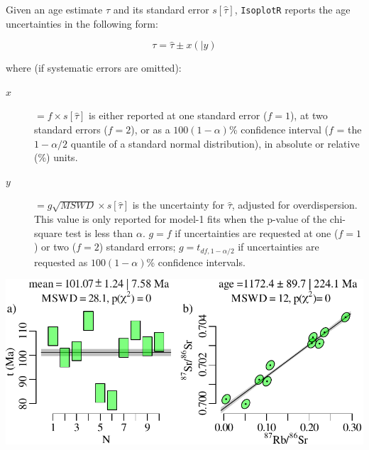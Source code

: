 \begin{refsection}
Given an age estimate $\hat{\tau}$ and its standard error
$s[\hat{\tau}]$, \texttt{IsoplotR} reports the age uncertainties in
the following form:

\[
\tau = \hat{\tau} \pm x (\mid y)
\]

\noindent where (if systematic errors are omitted):

\begin{description}
\item[$x$] $= f \times s[\hat{\tau}]$ is either reported at one
  standard error ($f=1$), at two standard errors ($f=2$), or as a
  $100(1-\alpha)$\% confidence interval ($f$ = the $1-\alpha/2$
  quantile of a standard normal distribution), in absolute or relative
  (\%) units.
\item[$y$] $= g \sqrt{MSWD} \times s[\hat{\tau}]$ is the uncertainty
  for $\hat{\tau}$, adjusted for overdispersion. This value is only
  reported for model-1 fits when the p-value of the chi-square test is
  less than $\alpha$. $g=f$ if uncertainties are requested at one
  ($f=1$) or two ($f=2$) standard errors; $g=t_{df,1-\alpha/2}$ if
  uncertainties are requested as $100(1-\alpha)$\% confidence
  intervals.
\end{description}

\noindent\begin{minipage}[t][][b]{.6\textwidth}
  \includegraphics[width=\textwidth]{../figures/model-1.pdf}\\
\end{minipage}
\begin{minipage}[t][][t]{.4\textwidth}
  \label{fig:model-1}
\end{minipage}


\end{refsection}
